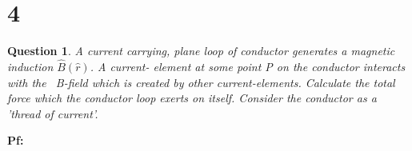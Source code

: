 \documentclass{article}
\newtheorem{question}{Question}
\begin{document}
\break

\section*{4}
\begin{myBox}[]{}
    \begin{question}
        A current carrying, plane loop of conductor generates a magnetic induction $\hat{B}(\hat{r})$. A current-
        element at some point P on the conductor interacts with the ~B-field which is created by other
        current-elements. Calculate the total force which the conductor loop exerts on itself. Consider
        the conductor as a ’thread of current’.
    \end{question}
\end{myBox}

\textbf{Pf:}
\end{document}
